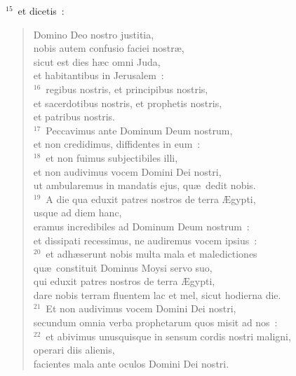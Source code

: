 ${}^{15}$~et dicetis~: \begin{verse}Domino Deo nostro justitia,\\ nobis autem confusio faciei nostr\ae ,\\ sicut est dies h\ae c omni Juda,\\ et habitantibus in Jerusalem~:\\
${}^{16}$~regibus nostris, et principibus nostris,\\ et sacerdotibus nostris, et prophetis nostris,\\ et patribus nostris.\\
${}^{17}$~Peccavimus ante Dominum Deum nostrum,\\ et non credidimus, diffidentes in eum~:\\
${}^{18}$~et non fuimus subjectibiles illi,\\ et non audivimus vocem Domini Dei nostri,\\ ut ambularemus in mandatis ejus, qu\ae\ dedit nobis.\\
${}^{19}$~A die qua eduxit patres nostros de terra \AE gypti,\\ usque ad diem hanc,\\ eramus incredibiles ad Dominum Deum nostrum~:\\ et dissipati recessimus, ne audiremus vocem ipsius~:\\
${}^{20}$~et adh\ae serunt nobis multa mala et maledictiones\\ qu\ae\ constituit Dominus Moysi servo suo,\\ qui eduxit patres nostros de terra \AE gypti,\\ dare nobis terram fluentem lac et mel, sicut hodierna die.\\
${}^{21}$~Et non audivimus vocem Domini Dei nostri,\\ secundum omnia verba prophetarum quos misit ad nos~:\\
${}^{22}$~et abivimus unusquisque in sensum cordis nostri maligni,\\ operari diis alienis,\\ facientes mala ante oculos Domini Dei nostri.\end{verse}



